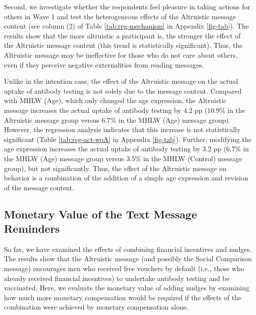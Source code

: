 \documentclass[
]{article}
\begin{document}
Second, we investigate whether the respondents feel pleasure in taking actions for others in Wave 1 and test the heterogeneous effects of the Altruistic message content (see column (2) of Table \ref{tab:reg-mechanism} in Appendix \ref{fig-tab}). The results show that the more altruistic a participant is, the stronger the effect of the Altruistic message content (this trend is statistically significant). Thus, the Altruistic message may be ineffective for those who do not care about others, even if they perceive negative externalities from reading messages.

Unlike in the intention case, the effect of the Altruistic message on the actual uptake of antibody testing is not solely due to the message content. Compared with MHLW (Age), which only changed the age expression, the Altruistic message increases the actual uptake of antibody testing by \(4.2\) pp (\(10.9\)\% in the Altruistic message group versus \(6.7\)\% in the MHLW (Age) message group). However, the regression analysis indicates that this increase is not statistically significant (Table \ref{tab:reg-act-woA} in Appendix \ref{fig-tab}). Further, modifying the age expression increases the actual uptake of antibody testing by \(3.2\) pp (\(6.7\)\% in the MHLW (Age) message group versus \(3.5\)\% in the MHLW (Control) message group), but not significantly. Thus, the effect of the Altruistic message on behavior is a combination of the addition of a simple age expression and revision of the message content.

\hypertarget{monetary-value-of-the-text-message-reminders}{%
\subsection{Monetary Value of the Text Message Reminders}\label{monetary-value-of-the-text-message-reminders}}

So far, we have examined the effects of combining financial incentives and nudges. The results show that the Altruistic message (and possibly the Social Comparison message) encourages men who received free vouchers by default (i.e., those who already received financial incentives) to undertake antibody testing and be vaccinated. Here, we evaluate the monetary value of adding nudges by examining how much more monetary compensation would be required if the effects of the combination were achieved by monetary compensation alone.
\end{document}
